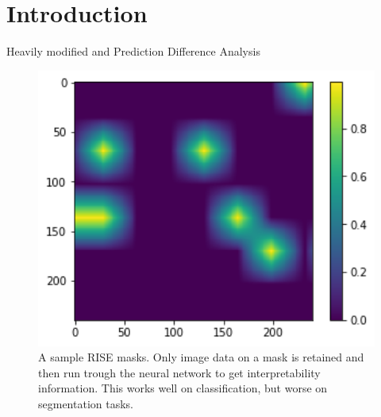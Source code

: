 \section{Introduction}
Heavily modified \cite{zeiler2014visualizing} and 
Prediction Difference Analysis \cite{zintgraf2017visualizing}


\begin{figure}[H]
\centering
\includegraphics[width=14cm]{chapters/02_methods/images/rise/rise0_mask.png}
\caption{A sample RISE masks. Only image data on a mask is retained and then run trough the neural network to get interpretability information. This works well on classification, but worse on segmentation tasks.}
\end{figure}
